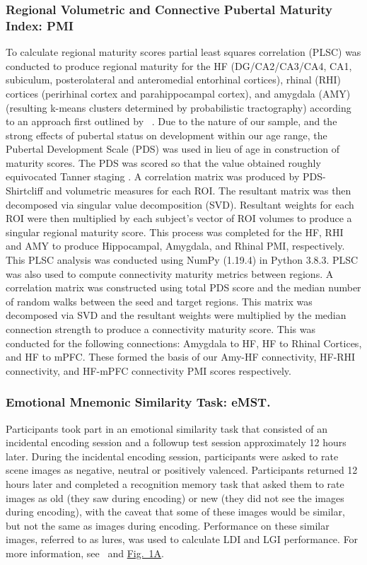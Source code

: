 \documentclass[11pt]{article}
\providecommand\citep{\cite}
\begin{document}
\subsubsection*{Regional Volumetric and Connective Pubertal Maturity Index: PMI}
To calculate regional maturity scores partial least squares correlation (PLSC) was
conducted to produce regional maturity for the HF (DG/CA2/CA3/CA4, CA1, subiculum,
posterolateral and anteromedial entorhinal cortices), rhinal (RHI) cortices (perirhinal
cortex and parahippocampal cortex), and amygdala (AMY) (resulting k-means clusters
determined by probabilistic tractography) according to an approach first outlined by
~\cite{keresztes_adaptive_2017}. Due to the nature of our sample, and the strong effects
of pubertal status on development within our age range, the Pubertal Development Scale
(PDS) was used in lieu of age in construction of maturity scores. The PDS was scored so
that the value obtained roughly equivocated Tanner staging
\citep{shirtcliff_pubertal_2009}. A correlation matrix was produced by PDS-Shirtcliff
and volumetric measures for each ROI\@. The resultant matrix was then decomposed via
singular value decomposition (SVD). Resultant weights for each ROI were
then multiplied by each subject's vector of ROI volumes to produce a singular regional
maturity score. This process was completed for the HF, RHI and AMY to produce
Hippocampal, Amygdala, and Rhinal PMI, respectively. This PLSC analysis was conducted
using NumPy (1.19.4) \citep{harris_numpy_2020} in Python 3.8.3.
PLSC was also used to compute connectivity maturity metrics between regions. A
correlation matrix was constructed using total PDS score and the median number of random
walks between the seed and target regions. This matrix was decomposed via SVD and the
resultant weights were multiplied by the median connection strength to produce a
connectivity maturity score. This was conducted for the following connections:
Amygdala to HF, HF to Rhinal Cortices, and HF to mPFC\@. These formed the basis of our
Amy-HF connectivity, HF-RHI connectivity, and HF-mPFC
connectivity PMI scores respectively.

\subsubsection*{Emotional Mnemonic Similarity Task: eMST.} Participants took part in an
emotional similarity task that consisted of an incidental encoding session and a
followup test session approximately 12 hours later. During the incidental encoding
session, participants were asked to rate scene images as negative, neutral or positively
valenced. Participants returned 12 hours later and completed a recognition memory task
that asked them to rate images as old (they saw during encoding) or new (they did not
see the images during encoding), with the caveat that some of these images would be
similar, but not the same as images during encoding. Performance on these similar
images, referred to as lures, was used to calculate LDI and LGI performance. For more
information, see~\cite{mcmakin_negative_2021} and \hyperref[fig:1]{Fig.\ 1A}. \par
\end{document}

